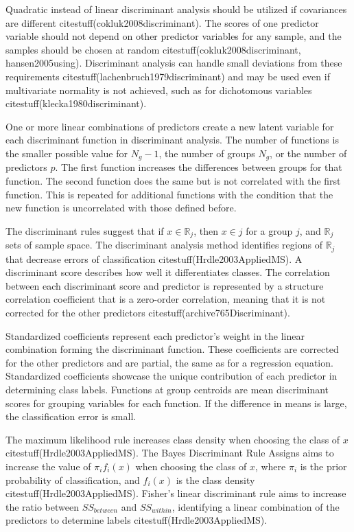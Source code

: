 \documentclass[preprint,12pt]{elsarticle}
\begin{document}
Quadratic instead of linear discriminant analysis should be utilized if covariances are different citestuff(cokluk2008discriminant). The scores of one predictor variable should not depend on other predictor variables for any sample, and the samples should be chosen at random citestuff(cokluk2008discriminant, hansen2005using). Discriminant analysis can handle small deviations from these requirements citestuff(lachenbruch1979discriminant) and may be used even if multivariate normality is not achieved, such as for dichotomous variables citestuff(klecka1980discriminant).

One or more linear combinations of predictors create a new latent variable for each discriminant function in discriminant analysis. The number of functions is the smaller possible value for $N_{g}-1$, the number of groups $N_{g}$, or the number of predictors $p$. The first function increases the differences between groups for that function. The second function does the same but is not correlated with the first function. This is repeated for additional functions with the condition that the new function is uncorrelated with those defined before.

The discriminant rules suggest that if $x\in \mathbb{R}_{j}$, then $x\in j$ for a group $j$, and $\mathbb{R}_{j}$ sets of sample space. The discriminant analysis method identifies regions of $\mathbb{R}_{j}$ that decrease errors of classification citestuff(Hrdle2003AppliedMS).
A discriminant score describes how well it differentiates classes.
The correlation between each discriminant score and predictor is represented by a structure correlation coefficient that is a zero-order correlation, meaning that it is not corrected for the other predictors citestuff(archive765Discriminant).


Standardized coefficients represent each predictor's weight in the linear combination forming the discriminant function. These coefficients are corrected for the other predictors and are partial, the same as for a regression equation. Standardized coefficients showcase the unique contribution of each predictor in determining class labels. Functions at group centroids are mean discriminant scores for grouping variables for each function. If the difference in means is large, the classification error is small.

The maximum likelihood rule increases class density when choosing the class of $x$ citestuff(Hrdle2003AppliedMS).
The Bayes Discriminant Rule Assigns aims to increase the value of $\pi_{i}f_{i}(x)$ when choosing the class of $x$, where $\pi_{i}$ is the prior probability of classification, and $f_{i}(x)$ is the class density citestuff(Hrdle2003AppliedMS). Fisher's linear discriminant rule aims to increase the ratio between $SS_{between}$ and $SS_{within}$, identifying a linear combination of the predictors to determine labels citestuff(Hrdle2003AppliedMS).
\end{document}

